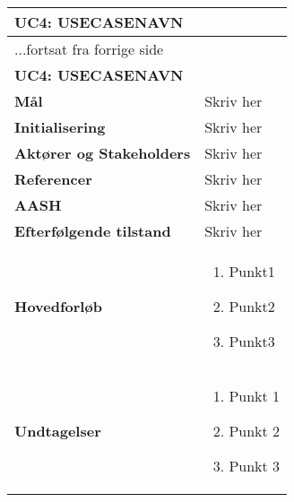 \begin{center} \centering \label{UC4}
	\begin{longtable}{|p{5cm}|p{9cm}|}  %
	\hline
		\multicolumn{2}{|l|}{\textbf{UC4: USECASENAVN}} \\\hline %
		\endfirsthead
		
		\multicolumn{2}{l}{...fortsat fra forrige side} \\ \hline %
		\multicolumn{2}{|l|}{\textbf{UC4: USECASENAVN}} \\\hline %
		\endhead	
		
		\textbf{Mål}							&Skriv her		\\\hline
		\textbf{Initialisering}				&Skriv her		\\\hline
		\textbf{Aktører og Stakeholders}		&Skriv her		\\\hline 
		\textbf{Referencer}					&Skriv her		\\\hline
		\textbf{AASH}						&Skriv her		\\\hline
		\textbf{Efterfølgende tilstand}		&Skriv her		\\\hline
		\textbf{Hovedforløb}					
			&\begin{enumerate}
	
				\item Punkt1
				
				\item Punkt2				
				
				\item Punkt3
				
			\end{enumerate}
		\\\hline
		\textbf{Undtagelser}
			&\begin{enumerate}
			
				\item Punkt 1

				\item Punkt 2
				
				\item Punkt 3

			\end{enumerate}
		\\\hline
	\end{longtable} 
\end{center}

